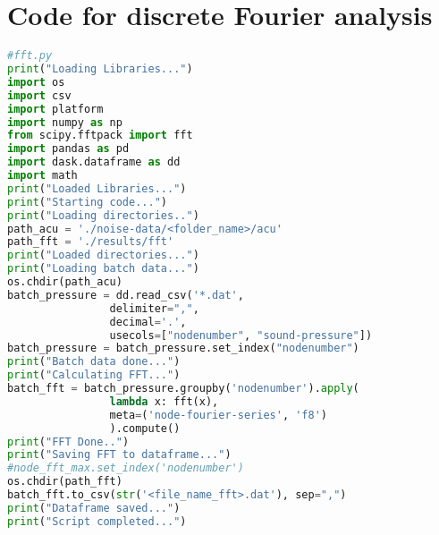 \chapter{Code for discrete Fourier analysis} %

\label{codefft} %


\begin{lstlisting}[language=Python]
#fft.py
print("Loading Libraries...")
import os
import csv
import platform
import numpy as np
from scipy.fftpack import fft
import pandas as pd
import dask.dataframe as dd
import math
print("Loaded Libraries...")
print("Starting code...")
print("Loading directories..")
path_acu = './noise-data/<folder_name>/acu'
path_fft = './results/fft'
print("Loaded directories...")
print("Loading batch data...")
os.chdir(path_acu)
batch_pressure = dd.read_csv('*.dat',
				delimiter=",",
				decimal='.',
				usecols=["nodenumber", "sound-pressure"])
batch_pressure = batch_pressure.set_index("nodenumber")
print("Batch data done...")
print("Calculating FFT...") 
batch_fft = batch_pressure.groupby('nodenumber').apply(
				lambda x: fft(x),
				meta=('node-fourier-series', 'f8')
				).compute()
print("FFT Done..") 
print("Saving FFT to dataframe...")
#node_fft_max.set_index('nodenumber')
os.chdir(path_fft)
batch_fft.to_csv(str('<file_name_fft>.dat'), sep=",")
print("Dataframe saved...")
print("Script completed...")
\end{lstlisting}